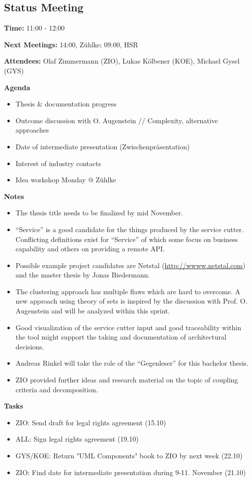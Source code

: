 \subsection{Status Meeting }

\textbf{Time:} 11:00 - 12:00

\textbf{Next Meetings:}  14:00, Z\"uhlke;  09:00, HSR
 
\textbf{Attendees:} Olaf Zimmermann (ZIO), Lukas Kölbener (KOE), Michael Gysel (GYS)

\textbf{Agenda}

\begin{itemize}
\item Thesis \& documentation progress
\item Outcome discussion with O. Augenstein // Complexity, alternative approaches
\item Date of intermediate presentation (Zwischenpr\"asentation)
\item Interest of industry contacts
\item Idea workshop Monday @ Z\"uhlke
\end{itemize}


\textbf{Notes}
\begin{itemize}
\item The thesis title needs to be finalized by mid November.
\item \enquote{Service} is a good candidate for the things produced by the service cutter. Conflicting definitions exist for \enquote{Service} of which some focus on business capability and others on providing a remote API. 
\item Possible example project candidates are Netstal (\url{http://wwww.netstal.com}) and the master thesis by Jonas Biedermann.
\item The clustering approach has multiple flaws which are hard to overcome. A new approach using theory of sets is inspired by the discussion with Prof. O. Augenstein and will be analyzed within this sprint. 
\item Good visualization of the service cutter input and good traceability within the tool might support the taking and documentation of architectural decisions.
\item Andreas Rinkel will take the role of the \enquote{Gegenleser} for this bachelor thesis.
\item ZIO provided further ideas and research material on the topic of coupling criteria and decomposition. 
\end{itemize}
 
\textbf{Tasks}
\begin{itemize}
\item ZIO: Send draft for legal rights agreement (15.10)
\item ALL: Sign legal rights agreement (19.10)
\item GYS/KOE: Return "UML Components" book to ZIO by next week (22.10)
\item ZIO: Find date for intermediate presentation during 9-11. November (21.10)
\end{itemize}
